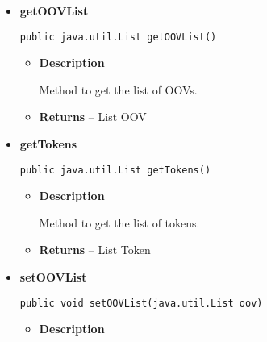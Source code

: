 {{{{{\begin{itemize}
{\begin{itemize}
{Method to add a token to the list.
}
\item{
{\bf  Parameters}
  \begin{itemize}
   \item{
\texttt{token} -- Token}
  \end{itemize}
}%
\end{itemize}
}%
\item{ 
\hypertarget{com.jmorenov.tweetsccore.preprocess.ApplyRulesResult.getOOVList()}{{\bf  getOOVList}\\}
\begin{lstlisting}[frame=none]
public java.util.List getOOVList()\end{lstlisting} %
\begin{itemize}
\item{
{\bf  Description}

Method to get the list of OOVs.
}
\item{{\bf  Returns} -- 
List OOV 
}%
\end{itemize}
}%
\item{ 
\hypertarget{com.jmorenov.tweetsccore.preprocess.ApplyRulesResult.getTokens()}{{\bf  getTokens}\\}
\begin{lstlisting}[frame=none]
public java.util.List getTokens()\end{lstlisting} %
\begin{itemize}
\item{
{\bf  Description}

Method to get the list of tokens.
}
\item{{\bf  Returns} -- 
List Token 
}%
\end{itemize}
}%
\item{ 
\hypertarget{com.jmorenov.tweetsccore.preprocess.ApplyRulesResult.setOOVList(java.util.List)}{{\bf  setOOVList}\\}
\begin{lstlisting}[frame=none]
public void setOOVList(java.util.List oov)\end{lstlisting} %
\begin{itemize}
\item{
{\bf  Description}

}
\end{itemize}}
\end{itemize}}}}}}
